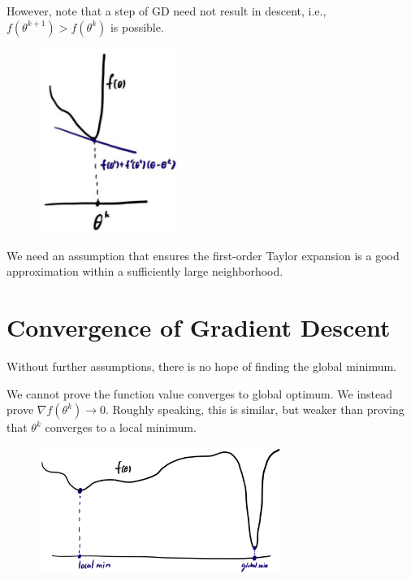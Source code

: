 \documentclass{report}
\begin{document}
However, note that a step of GD need not result in descent, i.e., $f\left(\theta^{k+1}\right)>f\left(\theta^{k}\right)$ is possible.

\begin{figure}[H]
    \centering
    \includegraphics[width=0.4\textwidth]{.././assets/2.1.png}
\end{figure}

We need an assumption that ensures the first-order Taylor expansion is a good approximation within a sufficiently large neighborhood.

\section{Convergence of Gradient Descent}

Without further assumptions, there is no hope of finding the global minimum.

We cannot prove the function value converges to global optimum. We instead prove $\nabla f\left(\theta^{k}\right) \rightarrow 0$. Roughly speaking, this is similar, but weaker than proving that $\theta^{k}$ converges to a local minimum.

\begin{figure}[H]
    \centering
    \includegraphics[width=0.7\textwidth]{.././assets/2.2.png}
\end{figure}
\end{document}
